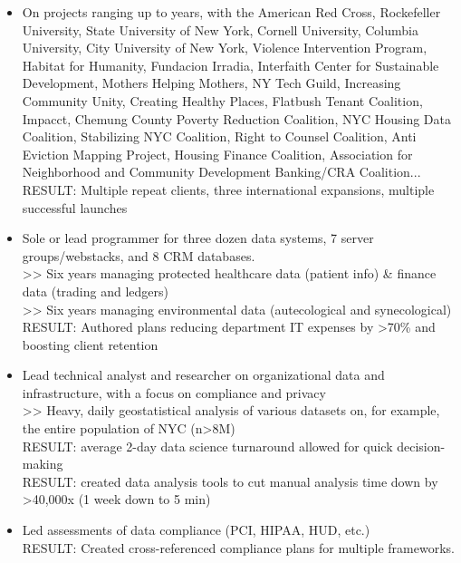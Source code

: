 \documentclass[]{deedy-resume-openfont}
\begin{document}
    \begin{itemize}
        \item On projects ranging up to years, with the American Red Cross, Rockefeller University, State University of New York, Cornell University, Columbia University, City University of New York, Violence Intervention Program, Habitat for Humanity, Fundacion Irradia, Interfaith Center for Sustainable Development, Mothers Helping Mothers, NY Tech Guild, Increasing Community Unity, Creating Healthy Places, Flatbush Tenant Coalition, Impacct, Chemung County Poverty Reduction Coalition, NYC Housing Data Coalition, Stabilizing NYC Coalition, Right to Counsel Coalition, Anti Eviction Mapping Project, Housing Finance Coalition, Association for Neighborhood and Community Development Banking/CRA Coalition...
        \\RESULT: Multiple repeat clients, three international expansions, multiple successful launches
        \item Sole or lead programmer for three dozen data systems, 7 server groups/webstacks, and 8 CRM databases.
        \\>> Six years managing protected healthcare data (patient info) \& finance data (trading and ledgers)
        \\>> Six years managing environmental data (autecological and synecological) 
        \\ RESULT: Authored plans reducing department IT expenses by >70\% and boosting client retention
        \item Lead technical analyst and researcher on organizational data and infrastructure, with a focus on compliance and privacy
        \\ >> Heavy, daily geostatistical analysis of various datasets on, for example, the entire population of NYC (n>8M)
        \\ RESULT: average 2-day data science turnaround allowed for quick decision-making
        \\ RESULT: created data analysis tools to cut manual analysis time down by >40,000x (1 week down to 5 min)
        \item Led assessments of data compliance (PCI, HIPAA, HUD, etc.)
        \\ RESULT: Created cross-referenced compliance plans for multiple frameworks.

\end{itemize}
\end{document}
